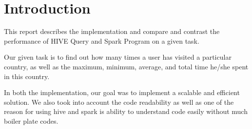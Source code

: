 \chapter{Introduction}
	This report describes the implementation and compare and contrast the performance of HIVE Query and Spark Program on a given task. 
	
	Our given task is to find out how many times a user has visited a particular country, as well as the maximum, minimum, average, and total time he/she spent in this country.

	In both the implementation, our goal was to implement a scalable and efficient solution. We also took into account the code readability as well as one of the reason for using hive and spark is ability to understand code easily without much boiler plate codes. 